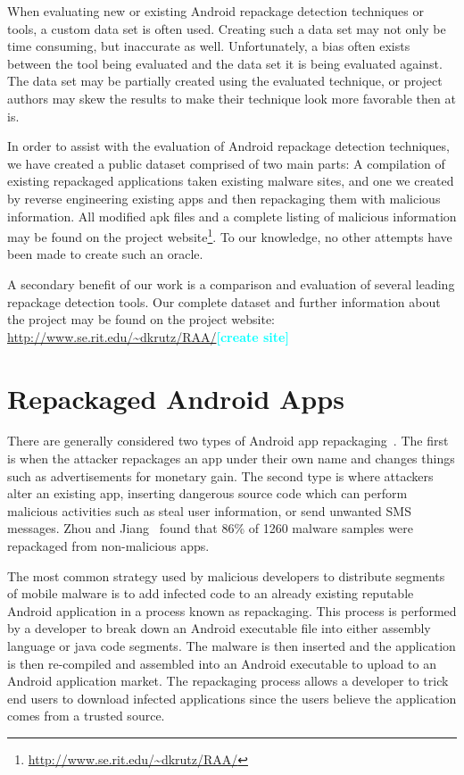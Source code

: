\documentclass{sig-alternate}
\newcommand{\todo}[1]{\textcolor{cyan}{\textbf{[#1]}}}
\begin{document}
When evaluating new or existing Android repackage detection techniques or tools, a custom data set is often used. Creating such a data set may not only be time consuming, but inaccurate as well. Unfortunately, a bias often exists between the tool being evaluated and the data set it is being evaluated against. The data set may be partially created using the evaluated technique, or project authors may skew the results to make their technique look more favorable then at is. 

In order to assist with the evaluation of Android repackage detection techniques, we have created a public dataset comprised of two main parts: A compilation of existing repackaged applications taken existing malware sites, and one we created by reverse engineering existing apps and then repackaging them with malicious information. All modified apk files and a complete listing of malicious information may be found on the project website\footnote{\url{http://www.se.rit.edu/~dkrutz/RAA/}}. To our knowledge, no other attempts have been made to create such an oracle.

A secondary benefit of our work is a comparison and evaluation of several leading repackage detection tools. Our complete dataset and further information about the project may be found on the project website: \url{http://www.se.rit.edu/~dkrutz/RAA/}\todo{create site}







\section{Repackaged Android Apps}
\label{sec: repackagedapps}




There are generally considered two types of Android app repackaging~\cite{Zhang:2014:VTO:2627393.2627395}. The first is when the attacker repackages an app under their own name and changes things such as advertisements for monetary gain. The second type is where attackers alter an existing app, inserting dangerous source code which can perform malicious activities such as steal user information, or send unwanted SMS messages. Zhou and Jiang~\cite{Zhou:2012:DAM:2310656.2310710} found that 86\% of 1260 malware samples were repackaged from non-malicious apps.

The most common strategy used by malicious developers to distribute segments of mobile malware is to add infected code to an already existing reputable Android application in a process known as repackaging. This process is performed by a developer to break down an Android executable file into either assembly language or java code segments. The malware is then inserted and the application is then re-compiled and assembled into an Android executable to upload to an Android application market. The repackaging process allows a developer to trick end users to download infected applications since the users believe the application comes from a trusted source.
\end{document}
